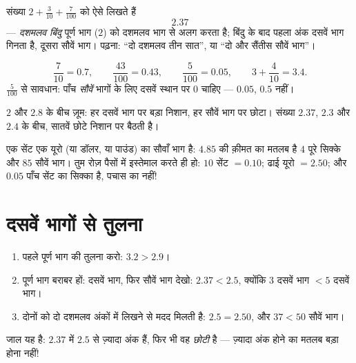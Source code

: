 \begin{definition}[दशमलव लेखन]\label{def:g4:decimals:point}
संख्या $2 + \frac{3}{10} + \frac{7}{100}$ को ऐसे लिखते हैं
\[
2.37
\]
--- \emph{दशमलव बिंदु} पूर्ण भाग ($2$) को दशमलव भाग से
अलग करता है; बिंदु के बाद पहला अंक दसवें भाग गिनता है, दूसरा
सौवें भाग। पढ़ना: ``दो दशमलव तीन सात'', या ``दो और सैंतीस सौवें
भाग''।
\end{definition}

\begin{example}\label{ex:g4:decimals:convert}
\[
\frac{7}{10} = 0.7, \qquad
\frac{43}{100} = 0.43, \qquad
\frac{5}{100} = 0.05, \qquad
3 + \frac{4}{10} = 3.4 .
\]
$\frac{5}{100}$ से सावधान: पाँच \emph{सौवें} भागों के लिए दसवें
स्थान पर $0$ चाहिए --- $0.05$, $0.5$ नहीं।
\end{example}

\begin{omfigure}

{\small $2$ और $2.8$ के बीच ज़ूम: हर दसवें भाग पर बड़ा निशान, हर
सौवें भाग पर छोटा। संख्या $2.37$, $2.3$ और $2.4$ के बीच,
सातवें छोटे निशान पर बैठती है।}
\end{omfigure}

\begin{example}[पैसा सौवें भागों में है]\label{ex:g4:decimals:money}
एक सेंट एक यूरो (या डॉलर, या पाउंड) का सौवाँ भाग है: $4.85$ की
क़ीमत का मतलब है $4$ पूरे सिक्के और $85$ सौवें भाग। 
तुम रोज़ पैसों में इस्तेमाल करते ही हो: $10$ सेंट $= 0.10$; ढाई
यूरो $= 2.50$; और $0.05$ पाँच सेंट का सिक्का है, पचास का नहीं!
\end{example}

\section{दसवें भागों से तुलना}

\begin{method}\label{met:g4:decimals:compare}
\begin{enumerate}
  \item पहले पूर्ण भाग की तुलना करो: $3.2 > 2.9$।
  \item पूर्ण भाग बराबर हों: दसवें भाग, फिर सौवें भाग देखो:
        $2.37 < 2.5$, क्योंकि $3$ दसवें भाग $< 5$ दसवें भाग।
  \item दोनों को दो दशमलव अंकों में लिखने से मदद मिलती है:
        $2.5 = 2.50$, और $37 < 50$ सौवें भाग।
\end{enumerate}
जाल यह है: $2.37$ में $2.5$ से ज़्यादा अंक हैं, फिर भी वह
\emph{छोटी} है --- ज़्यादा अंक होने का मतलब बड़ा होना नहीं!
\end{method}

